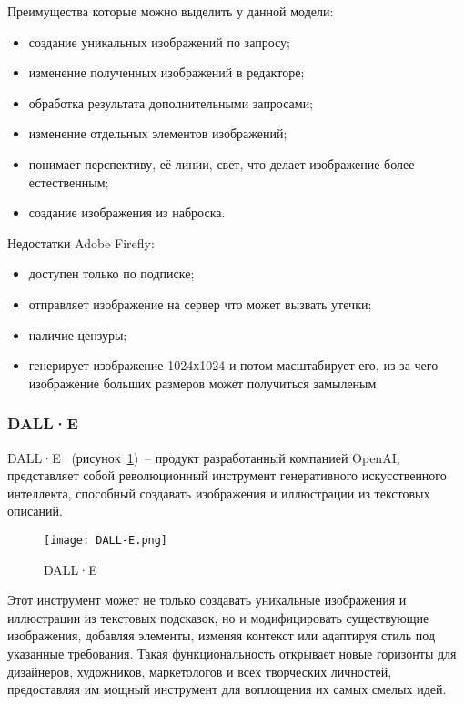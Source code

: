 Преимущества которые можно выделить у данной модели:
\begin{itemize}
    \item создание уникальных изображений по запросу;
    \item изменение полученных изображений в редакторе;
    \item обработка результата дополнительными запросами;
    \item изменение отдельных элементов изображений;
    \item понимает перспективу, её линии, свет, что делает изображение более естественным;
    \item создание изображения из наброска.
\end{itemize}

Недостатки Adobe Firefly:
\begin{itemize}
    \item доступен только по подписке;
    \item отправляет изображение на сервер что может вызвать утечки;
    \item наличие цензуры;
    \item генерирует изображение 1024х1024 и потом масштабирует его, из-за чего изображение больших размеров может получиться замыленым. 
\end{itemize}

\subsubsection{DALL·E}

DALL·E~\cite{dalle} (рисунок~\ref{domain::dalle})~-- продукт разработанный компанией OpenAI, представляет собой революционный инструмент генеративного искусственного интеллекта, способный создавать изображения и иллюстрации из текстовых описаний.

\begin{figure}[ht]
    \centering
    \texttt{[image: DALL-E.png]}
    \caption{DALL·E}
    \label{domain::dalle}
\end{figure}

Этот инструмент может не только создавать уникальные изображения и иллюстрации из текстовых подсказок, но и модифицировать существующие изображения, добавляя элементы, изменяя контекст или адаптируя стиль под указанные требования. Такая функциональность открывает новые горизонты для дизайнеров, художников, маркетологов и всех творческих личностей, предоставляя им мощный инструмент для воплощения их самых смелых идей.

